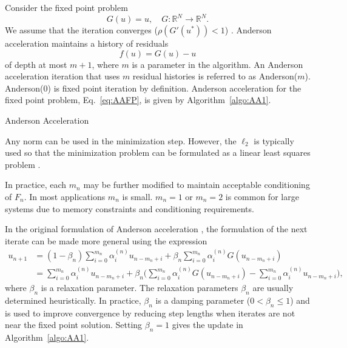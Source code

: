 Consider the fixed point problem
\begin{equation*}
	G(u) = u, \quad G: \mathbb{R}^{N} \rightarrow \mathbb{R}^{N}.
	\label{eq:AAFP}
\end{equation*}
We assume that the iteration converges ($\rho(G'(u^{*})) < 1$) \cite{ostrowski_solution_2016}. Anderson acceleration maintains a history of residuals
\begin{equation}
	f(u) = G(u) - u
\end{equation}
of depth at most $m + 1$, where $m$ is a parameter in the algorithm. An Anderson acceleration iteration that uses $m$ residual histories is referred to as Anderson($m$). Anderson(0) is fixed point iteration by definition. Anderson acceleration for the fixed point problem, Eq.~\ref{eq:AAFP}, is given by Algorithm~\ref{algo:AA1}. 
\begin{algorithm}[!htbp]
	\caption{Anderson Acceleration}
	\label{algo:AA1}
	\begin{algorithmic}
		\ENDFOR
	\end{algorithmic}
\end{algorithm}

Any norm can be used in the minimization step. However, the $\ell_{2}$ is typically used so that the minimization problem can be formulated as a linear least squares problem \cite{walker_anderson_2011}.

In practice, each $m_{n}$ may be further modified to maintain acceptable conditioning of $F_{n}$. In most applications $m_{n}$ is small. $m_{n} = 1$ or $m_{n} = 2$ is common for large systems due to memory constraints and conditioning requirements.

In the original formulation of Anderson acceleration \cite{anderson1965iterative}, the formulation of the next iterate can be made more general using the expression
\begin{align}
	u_{n+1} &= (1-\beta_{n}) \sum_{i=0}^{m_{n}} \alpha_{i}^{(n)} u_{n-m_{n}+i} + \beta_{n} \sum_{i=0}^{m_{n}} \alpha_{i}^{(n)}G(u_{n-m_{n}+i}) \\
	& = \sum_{i=0}^{m_{n}} \alpha_{i}^{(n)} u_{n-m_{n}+i} + \beta_{n} \bigg (  \sum_{i=0}^{m_{n}} \alpha_{i}^{(n)}G(u_{n-m_{n}+i}) - \sum_{i=0}^{m_{n}} \alpha_{i}^{(n)} u_{n-m_{n}+i} \bigg ),
\end{align}
where $\beta_{n}$ is a relaxation parameter. The relaxation parameters $\beta_{n}$ are usually determined heuristically. In practice, $\beta_{n}$ is a damping parameter ($0 < \beta_{n} \leq 1$) and is used to improve convergence by reducing step lengths when iterates are not near the fixed point solution. Setting $\beta_{n} = 1$ gives the update in Algorithm~\ref{algo:AA1}.

